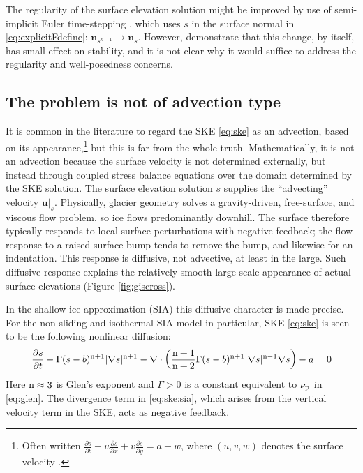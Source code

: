 \documentclass[hidelinks,onefignum,onetabnum,final]{siamart220329}  %
\newcommand{\grad}{\nabla}
\newcommand{\Div}{\nabla\cdot}
\newcommand{\bn}{\mathbf{n}}
\newcommand{\bu}{\mathbf{u}}
\newcommand{\nn}{{\text{\textnormal{n}}}}
\newcommand{\pp}{{\text{\textnormal{p}}}}
\begin{document}
The regularity of the surface elevation solution might be improved by use of semi-implicit Euler time-stepping  \cite{LofgrenAhlkronaHelanow2022}, which uses $s$ in the surface normal in \eqref{eq:explicitFdefine}: $\bn_{s^{n-1}} \to \bn_s$.  However, \cite{LofgrenAhlkronaHelanow2022} demonstrate that this change, by itself, has small effect on stability, and it is not clear why it would suffice to address the regularity and well-posedness concerns.

\subsection{The problem is not of advection type} \label{subsec:notadv}  It is common in the literature to regard the SKE \eqref{eq:ske} as an advection, based on its appearance,\footnote{Often written $\frac{\partial s}{\partial t} + u \frac{\partial s}{\partial x} + v \frac{\partial s}{\partial y} = a + w$, where $(u,v,w)$ denotes the surface velocity \cite{GreveBlatter2009,SchoofHewitt2013}.} but this is far from the whole truth.  Mathematically, it is not an advection because the surface velocity is not determined externally, but instead through coupled stress balance equations over the domain determined by the SKE solution.  The surface elevation solution $s$ supplies the ``advecting'' velocity $\bu|_s$.  Physically, glacier geometry solves a gravity-driven, free-surface, and viscous flow problem, so ice flows predominantly downhill.  The surface therefore typically responds to local surface perturbations with negative feedback; the flow response to a raised surface bump tends to remove the bump, and likewise for an indentation.  This response is diffusive, not advective, at least in the large.  Such diffusive response explains the relatively smooth large-scale appearance of actual surface elevations (Figure \ref{fig:giscross}).

In the shallow ice approximation (SIA) this diffusive character is made precise.  For the non-sliding and isothermal SIA model \cite{GreveBlatter2009,JouvetBueler2012} in particular, SKE \eqref{eq:ske} is seen to be the following nonlinear diffusion:
\begin{equation}
\frac{\partial s}{\partial t} - \Gamma (s-b)^{\nn+1} |\grad s|^{\nn+1} - \Div \left(\frac{\nn+1}{\nn+2} \Gamma (s-b)^{\nn+1} |\grad s|^{\nn-1} \grad s\right) - a = 0  \label{eq:ske:sia}
\end{equation}
Here $\nn\approx 3$ is Glen's exponent \cite{GreveBlatter2009} and $\Gamma>0$ is a constant equivalent to $\nu_\pp$ in \eqref{eq:glen}.  The divergence term in \eqref{eq:ske:sia}, which arises from the vertical velocity term in the SKE, acts as negative feedback.
\end{document}
